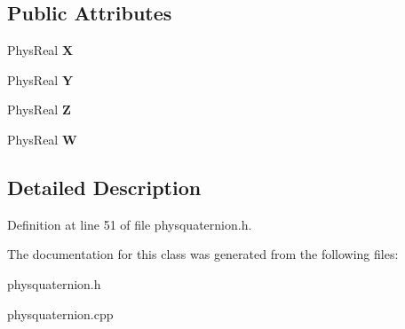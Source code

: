 \subsection*{Public Attributes}
\begin{DoxyCompactItemize}
\item 
\hypertarget{classPhysQuaternion_ac6ef4975979103a0285379e166dafc9c}{
PhysReal {\bfseries X}}
\label{d5/d19/classPhysQuaternion_ac6ef4975979103a0285379e166dafc9c}

\item 
\hypertarget{classPhysQuaternion_a2b07bc54cfd68f82588cb869f8ef4428}{
PhysReal {\bfseries Y}}
\label{d5/d19/classPhysQuaternion_a2b07bc54cfd68f82588cb869f8ef4428}

\item 
\hypertarget{classPhysQuaternion_a991d092617466f15ab7c297059668cf2}{
PhysReal {\bfseries Z}}
\label{d5/d19/classPhysQuaternion_a991d092617466f15ab7c297059668cf2}

\item 
\hypertarget{classPhysQuaternion_a5569a775ccde5755ffa4a12a0a31c555}{
PhysReal {\bfseries W}}
\label{d5/d19/classPhysQuaternion_a5569a775ccde5755ffa4a12a0a31c555}

\end{DoxyCompactItemize}


\subsection{Detailed Description}


Definition at line 51 of file physquaternion.h.

The documentation for this class was generated from the following files:\begin{DoxyCompactItemize}
\item 
physquaternion.h\item 
physquaternion.cpp\end{DoxyCompactItemize}
